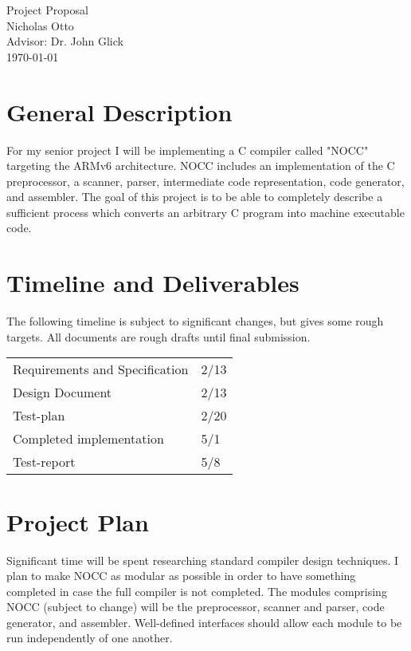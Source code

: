 \documentclass{article}
\begin{document}
\begin{center}
\Huge
Project Proposal\\ \vspace{2cm}
\Large
Nicholas Otto\\
Advisor: Dr. John Glick\\
\today
\end{center}

\newpage
\section{General Description}
For my senior project I will be implementing a C compiler called "NOCC" targeting the ARMv6 architecture.  
NOCC includes an implementation of the C preprocessor, a scanner, parser, intermediate code representation, code generator, and assembler.  
The goal of this project is to be able to completely describe a sufficient process which converts an arbitrary C program into machine executable code.

\section{Timeline and Deliverables}
The following timeline is subject to significant changes, but gives some rough targets.  
All documents are rough drafts until final submission.

\begin{tabular}{l l}
Requirements and Specification & 2/13\\
Design Document & 2/13\\
Test-plan & 2/20\\
Completed implementation & 5/1\\
Test-report & 5/8
\end{tabular}

\section{Project Plan}
Significant time will be spent researching standard compiler design techniques.  
I plan to make NOCC as modular as possible in order to have something completed in case the full compiler is not completed.
The modules comprising NOCC (subject to change) will be the preprocessor, scanner and parser, code generator, and assembler.
Well-defined interfaces should allow each module to be run independently of one another.
\end{document}

